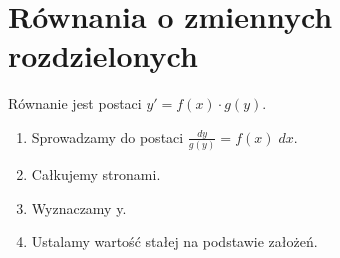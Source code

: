 \section{Równania o zmiennych rozdzielonych}
Równanie jest postaci \( y' = f(x) \cdot g(y) \).
\begin{enumerate}
\singlespacing
    \item Sprowadzamy do postaci \( \frac{dy}{g(y)}=f(x)\;dx \).
    \item Całkujemy stronami.
    \item Wyznaczamy y.
    \item Ustalamy wartość stałej na podstawie założeń.
\end{enumerate}